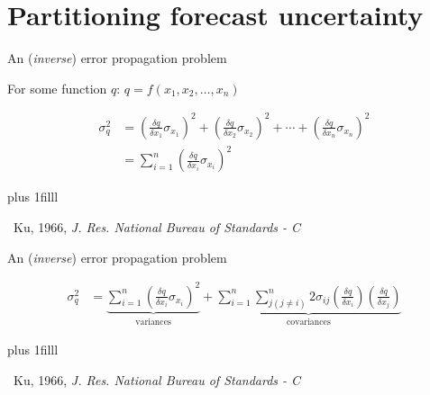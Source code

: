 \documentclass[14pt, compress, aspectratio=1610]{beamer}
\newcommand{\btVFill}{\vskip0pt plus 1filll}
\newcommand{\credit}[1]{\btVFill\par\hfill \footnotesize ~#1}
\begin{document}
\hypertarget{partitioning-forecast-uncertainty}{%
\section{Partitioning forecast
uncertainty}\label{partitioning-forecast-uncertainty}}

\begin{frame}{%
\protect\hypertarget{an-error-propagation-problem}{%
An (\emph{inverse}) error propagation problem}}

For some function \(q\): \(q = f(x_1,x_2,\dots,x_n)\)

\begin{align*}
\sigma^2_q &= \left( \frac{\delta q}{\delta x_1} \sigma_{x_1} \right)^2 + \left( \frac{\delta q}{\delta x_2} \sigma_{x_2} \right)^2 + \cdots + \left( \frac{\delta q}{\delta x_n} \sigma_{x_n} \right)^2 \\
&= \sum^n_{i=1}\left( \frac{\delta q}{\delta x_i} \sigma_{x_i} \right)^2
\end{align*}

\credit{Ku, 1966, \emph{J. Res. National Bureau of Standards - C}}

\end{frame}

\begin{frame}{%
\protect\hypertarget{an-error-propagation-problem-1}{%
An (\emph{inverse}) error propagation problem}}

\begin{align*}
\sigma^2_q &= \underbrace{\sum^n_{i=1}\left( \frac{\delta q}{\delta x_i} \sigma_{x_i} \right)^2}_{\text{variances}} + \underbrace{\sum^n_{i=1} \sum^n_{j(j \ne i)} 2 \sigma_{ij}\left( \frac{\delta q}{\delta x_i} \right)\left( \frac{\delta q}{\delta x_j} \right)}_{\text{covariances}}
\end{align*}

\credit{Ku, 1966, \emph{J. Res. National Bureau of Standards - C}}

\end{frame}
\end{document}

